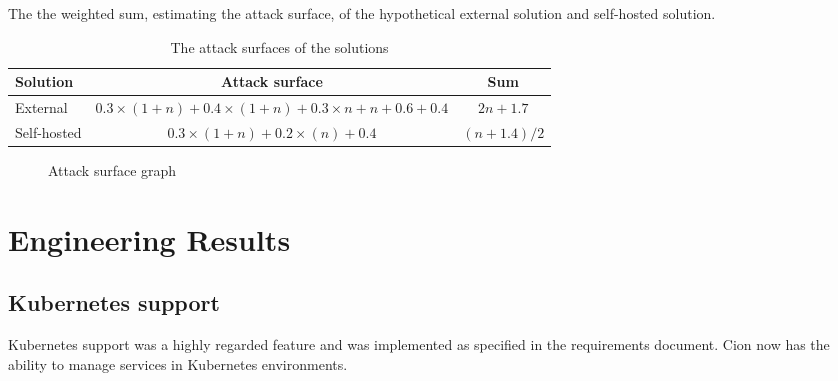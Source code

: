 The the weighted sum, estimating the attack surface, of the hypothetical external solution and self-hosted solution.
\begin{table}[ht]
    \begin{tabularx}{\textwidth}{|X|c|c|}
        \hline
        \textbf{Solution}  & \textbf{Attack surface} & \textbf{Sum}\\ \hline \hline
        External           & $0.3\times(1+n) + 0.4\times(1+n) + 0.3\times n + n + 0.6 + 0.4$ & $2n + 1.7$\\ \hline
        Self-hosted        & $0.3\times(1+n) + 0.2\times(n) + 0.4$ & $(n + 1.4)/2$\\ \hline
    \end{tabularx}
    \caption{The attack surfaces of the solutions}
    \label{tab:result1}
\end{table}

\begin{center}
    \begin{figure}
        \caption{Attack surface graph}
        \label{fig:my_label}
    \end{figure}
\end{center}

\section{Engineering Results}

\subsection{Kubernetes support}
Kubernetes support was a highly regarded feature and was implemented as specified in the requirements document. Cion now has the ability to manage services in Kubernetes environments.


